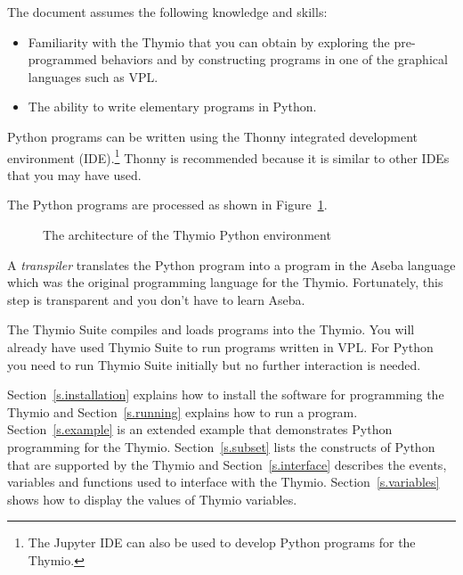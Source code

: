 \documentclass[11pt,a4paper]{article}
\begin{document}
The document assumes the following knowledge and skills:
\begin{itemize}
\item Familiarity with the Thymio that you can obtain by exploring the pre-programmed behaviors and by constructing programs in one of the graphical languages such as VPL.

\item The ability to write elementary programs in Python.
\end{itemize}

Python programs can be written using the Thonny integrated development environment (IDE).\footnote{The Jupyter IDE can also be used to develop Python programs for the Thymio.} Thonny is recommended because it is similar to other IDEs that you may have used.

The Python programs are processed as shown in Figure~\ref{f.architecture}.
\begin{figure}[hb]
\begin{center}
\end{center}
\caption{The architecture of the Thymio Python environment}\label{f.architecture}
\end{figure}


A \emph{transpiler} translates the Python program into a program in the Aseba language which was the original programming language for the Thymio. Fortunately, this step is transparent and you don't have to learn Aseba.

The Thymio Suite compiles and loads programs into the Thymio. You will already have used Thymio Suite to run programs written in VPL. For Python you need to run Thymio Suite initially but no further interaction is needed.

Section~\ref{s.installation} explains how to install the software  for programming the Thymio and Section~\ref{s.running} explains how to run a program. Section~\ref{s.example} is an extended example that demonstrates Python programming for the Thymio. Section~\ref{s.subset} lists the constructs of Python that are supported by the Thymio and Section~\ref{s.interface} describes the events, variables and functions used to interface with the Thymio. Section~\ref{s.variables} shows how to display the values of Thymio variables.
\end{document}
